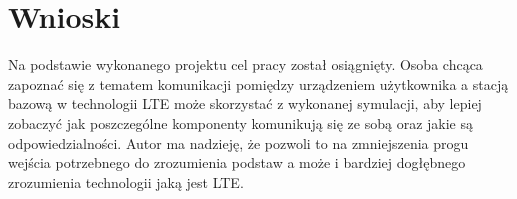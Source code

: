 \section{Wnioski}

Na podstawie wykonanego projektu cel pracy został osiągnięty. Osoba chcąca zapoznać się z tematem komunikacji pomiędzy urządzeniem użytkownika a stacją bazową w technologii LTE może skorzystać z wykonanej symulacji, aby lepiej zobaczyć jak poszczególne komponenty komunikują się ze sobą oraz jakie są odpowiedzialności. Autor ma nadzieję, że pozwoli to na zmniejszenia progu wejścia potrzebnego do zrozumienia podstaw a może i bardziej dogłębnego zrozumienia technologii jaką jest LTE.
